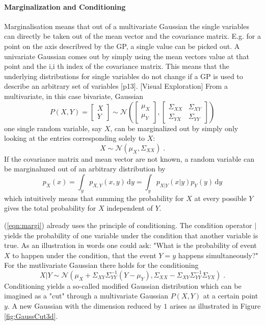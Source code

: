 \documentclass[%
  a4paper,oneside,%
  11pt,%
  smallchapters,
  green,%
  rgb, <cmyk>
  ]{tubsbook}
\begin{document}
\paragraph{Marginalization and Conditioning} 
\label{sec:Marg}
Marginalisation means that out of a multivariate Gaussian the single variables can directly be taken out of the mean vector and the covariance matrix. E.g. for a point on the axis describved by the GP, a single value can be picked out. A univariate Gaussian comes out by simply using the mean vectors value at that point and the i,i th index of the covariance matrix. This means that the underlying distributions for single variables do not change if a GP is used to describe an arbitrary set of variables [p13].
[Visual Exploration]
From a multivariate, in this case bivariate, Gaussian
\begin{equation}
P(X,Y) = \begin{bmatrix}
           X \\
           Y
         \end{bmatrix} \sim \mathcal{N}\left( \begin{bmatrix}
           \mu_X \\
           \mu_Y
         \end{bmatrix}, \begin{bmatrix}
\Sigma_{XX} & \Sigma_{XY} \\
\Sigma_{YX} & \Sigma_{YY} 
\end{bmatrix}  \right)
\end{equation}
one single random variable, say $X$, can be marginalized out by simply only looking at the entries corresponding solely to $X$:
\begin{equation}
X \sim \mathcal{N}(\mu_X, \Sigma_{XX}) \;.
\end{equation}
If the covariance matrix and mean vector are not known, a random variable can be marginaluzed out of an arbitrary distribution by
\begin{equation}
p_X(x) = \int_y p_{X,Y}(x,y)\,\mathrm{d}y = \int_y p_{X|Y}(x|y)p_Y(y)\,\mathrm{d}y
\label{eqn:margi}
\end{equation}
which intuitively means that summing the probability for $X$ at every possible $Y$ gives the total probability for $X$ independent of $Y$. 

(\ref{eqn:margi}) already uses the principle of conditioning. The condition operator $|$ yields the probability of one variable under the condition that another variable is true. As an illustration in words one could ask: "What is the probability of event $X$ to happen under the condition, that the event $Y=y$ happens simultaneously?"
For the mutlivariate Gaussian there holds for the conditioning
\begin{equation}
X|Y \sim \mathcal{N}(\mu_X +\Sigma_{XY} \Sigma_{YY}^{-1}(Y-\mu_Y), \Sigma_{XX} - \Sigma_{XY}\Sigma_{YY}^{-1}\Sigma_{YX} ) \;.
\end{equation}
%
Conditioning yields a so-called modified Gaussian distribution which can be imagined as a "cut" through a multivariate Gaussian $P(X,Y)$ at a certain point $y$. A new Gaussian with the dimension reduced by $1$ arises as illustrated in Figure \ref{fig:GaussCut3d}.
\end{document}
